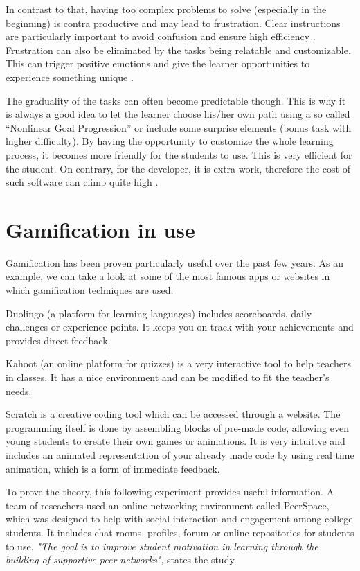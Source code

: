 \documentclass[10pt,english,a4paper]{article}
\begin{document}
	In contrast to that, having too complex problems to solve (especially in the beginning) is contra productive and may lead to frustration. 
	Clear instructions are particularly important to avoid confusion and ensure high efficiency \cite{Raymer}. 
	Frustration can also be eliminated by the tasks being relatable and customizable. 
	This can trigger positive emotions and give the learner opportunities to experience something unique \cite{ AL-Smadi}.
	
	The graduality of the tasks can often become predictable though.
	This is why it is always a good idea to let the learner choose his/her own path using a so called “Nonlinear Goal Progression” or include some surprise elements (bonus task with higher difficulty).
	By having the opportunity to customize the whole learning process, it becomes more friendly for the students to use. 
	This is very efficient for the student. On contrary, for the developer, it is extra work, therefore the cost of such software can climb quite high \cite{Raymer}.

\section{Gamification in use} \label{section4}
	Gamification has been proven particularly useful over the past few years.
	As an example, we can take a look at some of the most famous apps or websites in which gamification techniques are used.

	Duolingo (a platform for learning languages) includes scoreboards, daily challenges or experience points. 
	It keeps you on track with your achievements and provides direct feedback. 
		 
	Kahoot (an online platform for quizzes) is a very interactive tool to help teachers in classes. 
	It has a nice environment and can be modified to fit the teacher's needs.
		 
	Scratch is a creative coding tool which can be accessed through a website. 
	The programming itself is done by assembling blocks of pre-made code, allowing even young students to create their own games or animations. 
	It is very intuitive and includes an animated representation of your already made code by using real time animation, which is a form of immediate feedback.

	To prove the theory, this following experiment provides useful information. 
	A team of reseachers used an online networking environment called PeerSpace, which was designed to help with social interaction and engagement among college students.
	It includes chat rooms, profiles, forum or online repositories for students to use. 
	\textit{"The goal is to improve student motivation in learning through the building of supportive peer networks"}, states the study.
	
\end{document}

